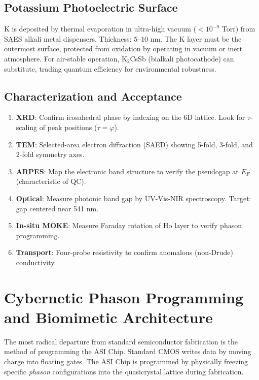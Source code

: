 \subsection{Potassium Photoelectric Surface}

K is deposited by thermal evaporation in ultra-high vacuum ($< 10^{-9}$ Torr) from SAES alkali metal dispensers. Thickness: $5$--$10$ nm. The K layer must be the outermost surface, protected from oxidation by operating in vacuum or inert atmosphere. For air-stable operation, K$_2$CsSb (bialkali photocathode) can substitute, trading quantum efficiency for environmental robustness.

\subsection{Characterization and Acceptance}

\begin{enumerate}
    \item \textbf{XRD}: Confirm icosahedral phase by indexing on the 6D lattice. Look for $\tau$-scaling of peak positions ($\tau = \varphi$).
    \item \textbf{TEM}: Selected-area electron diffraction (SAED) showing 5-fold, 3-fold, and 2-fold symmetry axes.
    \item \textbf{ARPES}: Map the electronic band structure to verify the pseudogap at $E_F$ (characteristic of QC).
    \item \textbf{Optical}: Measure photonic band gap by UV-Vis-NIR spectroscopy. Target: gap centered near 541 nm.
    \item \textbf{In-situ MOKE}: Measure Faraday rotation of Ho layer to verify phason programming.
    \item \textbf{Transport}: Four-probe resistivity to confirm anomalous (non-Drude) conductivity.
\end{enumerate}

\section{Cybernetic Phason Programming and Biomimetic Architecture}

The most radical departure from standard semiconductor fabrication is the method of programming the ASI Chip. Standard CMOS writes data by moving charge into floating gates. The ASI Chip is programmed by physically freezing specific \emph{phason} configurations into the quasicrystal lattice during fabrication.

